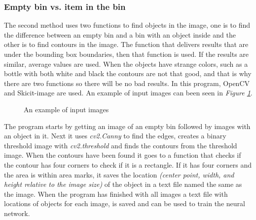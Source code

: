 \subsubsection*{Empty bin vs. item in the bin}\label{emptyvsitem}
The second method uses two functions to find objects in the image, one is to find the difference between an empty bin and a bin with an object inside and the other is to find contours in the image. 
The function that delivers results that are under the bounding box boundaries, then that function is used. If the results are similar, average values are used.
When the objects have strange colors, such as a bottle with both white and black the contours are not that good, and that is why there are two functions so there will be no bad results. 
In this program, OpenCV and Skicit-image are used. An example of input images can been seen in \textit{Figure \ref{figure: emptyafter}}.
\begin{figure}[h]
 \centering
 \hfill
 \caption{An example of input images}
 \label{figure: emptyafter}
\end{figure}

The program starts by getting an image of an empty bin followed by images with an object in it. 
Next it uses \textit{cv2.Canny} to find the edges, creates a binary threshold image with \textit{cv2.threshold} and finds the contours from the threshold image. 
When the contours have been found it goes to a function that checks if the contour has four corners to check if it is a rectangle. 
If it has four corners and the area is within area marks, it saves the location \textit{(center point, width, and height relative to the image size)} of the object in a text file named the same as the image. 
When the program has finished with all images a text file with locations of objects for each image, is saved and can be used to train the neural network. 


